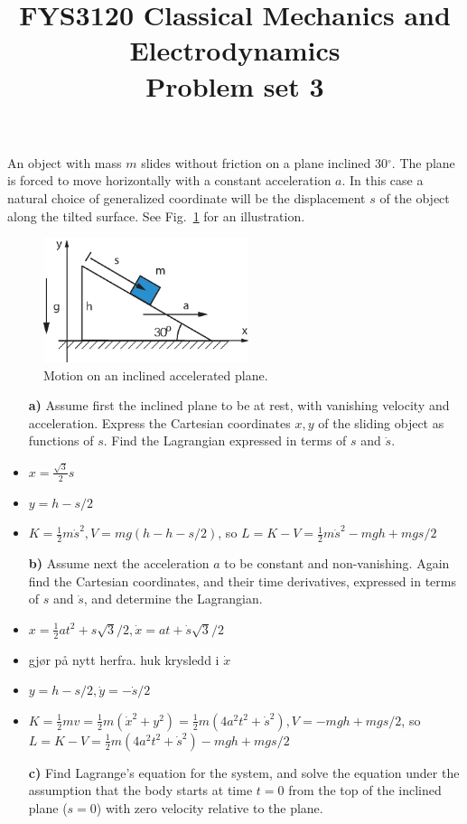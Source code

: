 \documentclass[11pt,a4paper]{report}
\title{FYS3120 Classical Mechanics and Electrodynamics\\ 
\vspace{15mm}Problem set 3}
\newcounter{excount}[chapter]
\newenvironment{exercise}[1][]{\addtocounter{excount}{1} \noindent {\bf Problem
    \arabic{excount} \ \ #1}\hspace{2mm}}{\vspace{4mm}}
\begin{document}
\maketitle


\begin{exercise}
An object with mass $m$ slides without friction on a plane inclined 30$^\circ$. The plane is forced to move horizontally with a constant acceleration $a$. In this case a natural choice of generalized coordinate will be the displacement $s$ of the object along the tilted surface. See Fig.~\ref{fig:incaccplane} for an illustration.

\begin{figure}[h]
\begin{center}
\includegraphics[width=6cm]{AkselerertSkraplan.eps}
\end{center}
\caption{Motion on an inclined accelerated plane.}
\label{fig:incaccplane}
\end{figure}

\begin{itemize}
\item[\bf a)] Assume first the inclined plane to be at rest, with vanishing velocity and acceleration. Express the Cartesian coordinates $x,y$ of the sliding object as functions of $s$. Find the Lagrangian expressed in terms of $s$ and $\dot s$.

\item $x=\frac{\sqrt{3}}{2}s$
\item $y=h-s/2$
\item $K=\frac{1}{2}m\dot{s}^2, V=mg(h-h-s/2)$, so $L=K-V=\frac{1}{2}m\dot{s}^2-mgh+mgs/2$

\item[\bf b)]  Assume next the acceleration $a$ to be constant and non-vanishing. Again find the Cartesian coordinates, and their time derivatives, expressed in terms of $s$ and $\dot s$, and determine the Lagrangian.

\item $x=\frac{1}{2} at^2+s\sqrt{3}/2, \dot{x}=at+\dot{s}\sqrt{3}/2$
\item gjør på nytt herfra. huk krysledd i $\dot{x}$
\item $y=h-s/2,\dot{y}=-\dot{s}/2$
\item $K=\frac{1}{2}mv=\frac{1}{2}m( \dot{x}^2+y^2)=\frac{1}{2}m(4a^2 t^2+\dot{s}^2), V=-mgh+mgs/2$, so $L=K-V=\frac{1}{2}m(4a^2 t^2+\dot{s}^2)-mgh+mgs/2$

\item[\bf c)] Find Lagrange's equation for the system, and solve the equation under the assumption that the body starts at time $t=0$ from the top of the inclined plane ($s=0$) with zero velocity relative to the plane.
\end{itemize}
\end{exercise}
\end{document}
